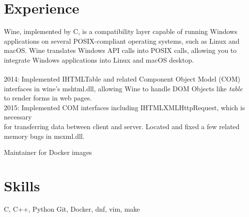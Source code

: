 

\section{Experience}

{
	{Wine, implemented by C, is a compatibility layer capable of running Windows applications on several %
	POSIX-compliant operating systems, such as Linux and macOS. Wine translates Windows API %
	calls into POSIX calls, allowing you to integrate Windows applications into Linux and %
	macOS desktop.\\ \\}
	{2014: Implemented IHTMLTable and related Component Object Model (COM) interfaces in wine's mshtml.dll, allowing Wine to handle DOM Objects like \textit{table} to render forms in web pages.}\\
	{2015: Implemented COM interfaces including IHTMLXMLHttpRequest, which is necessary \\
	for transferring data between client and server. Located and fixed a few related memory bugs in msxml.dll.}
}





{
Maintainer for Docker images
}

\vspace{-5mm}

\section{Skills}
{ C, C++, Python
	}
{Git, Docker, dnf, vim, make
	}
%




